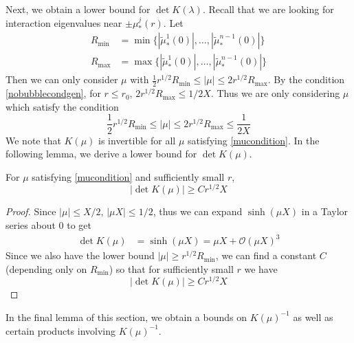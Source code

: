 \documentclass[thesis.tex]{subfiles}
\begin{document}
Next, we obtain a lower bound for $\det K(\lambda)$. Recall that we are looking for interaction eigenvalues near $\pm \mu_*^j(r)$. Let 
\begin{align*}
R_{\min} &= \min\{ |\tilde{\mu}_*^1(0)|, \dots, |\tilde{\mu}_*^{n-1}(0)| \} \\
R_{\max} &= \max \{ |\tilde{\mu}_*^1(0)|, \dots, |\tilde{\mu}_*^{n-1}(0)| \}
\end{align*}
Then we can only consider $\mu$ with $\frac{1}{2} r^{1/2}R_{\min} \leq |\mu| \leq 2 r^{1/2} R_{\max}$. By the condition \cref{nobubblecondgen}, for $r \leq r_0$, $2 r^{1/2} R_{\max} \leq 1/2X$. Thus we are only considering $\mu$ which satisfy the condition
\begin{equation}\label{mucondition}
\frac{1}{2} r^{1/2}R_{\min} \leq |\mu| \leq 2 r^{1/2} R_{\max} \leq \frac{1}{2X}
\end{equation}
We note that $K(\mu)$ is invertible for all $\mu$ satisfying \cref{mucondition}. In the following lemma, we derive a lower bound for $\det K(\mu)$.  

\begin{lemma}\label{detKlemma}
For $\mu$ satisfying \cref{mucondition} and sufficiently small $r$,
\[
|\det K(\mu)| \geq C r^{1/2}X
\]
\begin{proof}
Since $|\mu| \leq X/2$, $|\mu X| \leq 1/2$, thus we can expand $\sinh(\mu X)$ in a Taylor series about $0$ to get
\begin{align*}
\det K(\mu) &= \sinh(\mu X) = \mu X + \mathcal{O}(\mu X)^3
\end{align*}
Since we also have the lower bound $|\mu| \geq r^{1/2}R_{\min}$, we can find a constant $C$ (depending only on $R_{\min}$) so that for sufficiently small $r$ we have
\[
|\det K(\mu)| \geq C r^{1/2}X
\]
\end{proof}
\end{lemma}

In the final lemma of this section, we obtain a bounds on $K(\mu)^{-1}$ as well as certain products involving $K(\mu)^{-1}$.
\end{document}
